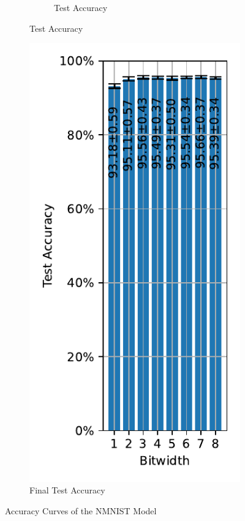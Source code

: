 \begin{figure}[H]
\begin{subfigure}[H]{0.69\textwidth}
\begin{subfigure}[H]{\textwidth}
                    \caption{Test Accuracy}
                \end{subfigure}
            \end{subfigure}
            \hfill
            \begin{subfigure}[H]{0.3\textwidth}
                \centering
                \includegraphics[width=\textwidth]{../standard/NMNIST/plots/nmnist_final_acc.pdf}
                \caption{Final Test Accuracy}
            \end{subfigure}
            \caption{Accuracy Curves of the NMNIST Model}
        \end{figure}

